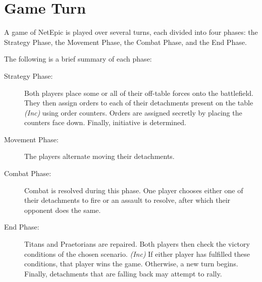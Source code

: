 \section{Game Turn}
A game of NetEpic is played over several turns, each divided into four phases: the Strategy Phase, the Movement Phase, the Combat Phase, and the End Phase.

The following is a brief summary of each phase:

\begin{description}
    \item[Strategy Phase:] Both players place some or all of their off-table forces onto the battlefield. They then assign orders to each of their detachments present on the table \textit{(Inc)} using order counters. Orders are assigned secretly by placing the counters face down. Finally, initiative is determined.

    \item[Movement Phase:] The players alternate moving their detachments.

    \item[Combat Phase:] Combat is resolved during this phase. One player chooses either one of their detachments to fire or an assault to resolve, after which their opponent does the same.

    \item[End Phase:] Titans and Praetorians are repaired. Both players then check the victory conditions of the chosen scenario. \textit{(Inc)} If either player has fulfilled these conditions, that player wins the game. Otherwise, a new turn begins. Finally, detachments that are falling back may attempt to rally.
\end{description}
